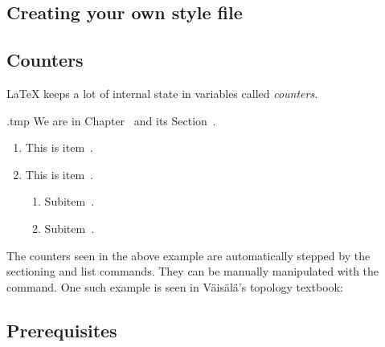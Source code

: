 \section{Creating your own style file}








%
%
%
\section{Counters}\label{sec:counters}

\LaTeX{} keeps a lot of internal state in variables called \emph{counters}.

\begin{VerbatimOut}{\jobname.tmp}
We are in Chapter~
and its Section~.

\begin{enumerate}
\item This is item~.
\item This is item~.
  \begin{enumerate}
  \item Subitem~.
  \item Subitem~.
  \end{enumerate}
\end{enumerate}
\end{VerbatimOut}
\ShowExample

The counters seen in the above example are automatically stepped by the sectioning and list commands.
They can be manually manipulated with the  command.
One such example is seen in Väisälä's topology textbook:

\begin{ExampleCode}
\setcounter{chapter}{-1}
\chapter{Prerequisites}

\end{ExampleCode}

